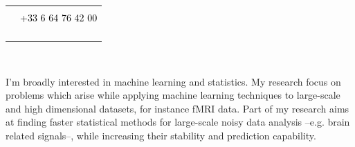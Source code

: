\documentclass[letterpaper]{article}
\newcommand{\MYhref}[3][black]{\href{#2}{\color{#1}{#3}}}%
\begin{document}
\begin{minipage}[t]{1\linewidth}
\begin{minipage}[t]{0.5\linewidth}
\begin{minipage}{1\linewidth}
\begin{minipage}{1\linewidth}
\begin{tabularx}{1\textwidth}{rX}
				\faMobilePhone& 
				\textcolor{black}{\MYhref{ahoyosidrobo@gmail.com}{ahoyosidrobo@gmail.com}}\\
				\vspace{1ex}
				& \textcolor{black}{+33 6 64 76 42 00}\\				
				\vspace{1ex}
				\faHome    & 
				\textcolor{black}{\MYhref{https://ahoyosid.github.io/}{https://ahoyosid.github.io/}}\\
				\vspace{1ex}
				\faTwitter & 
				\textcolor{black}{\MYhref{twitter.com/ahoyosid}{twitter.com/ahoyosid}}\\
				\vspace{1ex}
				\faGithub  & 
				\textcolor{black}{\MYhref{github.com/ahoyosid}{github.com/ahoyosid}}\\
				\vspace{1ex}
				\faLinkedin & 
				\textcolor{black}{\MYhref{linkedin.com/in/andres-hoyos-idroboi-85b42024}{linkedin.com/in/andres-hoyos-idroboi-85b42024}}\\
			\end{tabularx}
		\end{minipage} 
	\end{minipage} %
	\begin{minipage}{1\linewidth} %
		\vspace{2ex}
		\begin{minipage}{1\linewidth}
			\\
		\end{minipage}
		\begin{minipage}{1\linewidth}
			\vspace{2ex}
			{\normalsize I'm broadly interested in machine learning and 
			statistics. 
			My research focus on problems which arise while applying machine 	
			learning techniques to large-scale and high dimensional datasets,	
			for instance fMRI data. 
			Part of my research aims at finding faster statistical methods for 	
			large-scale	noisy data analysis --e.g. brain related signals--, 
			while increasing their stability and prediction capability.\\
			
}
\end{minipage}
\end{minipage}
\end{minipage}
\end{minipage}
\end{document}
